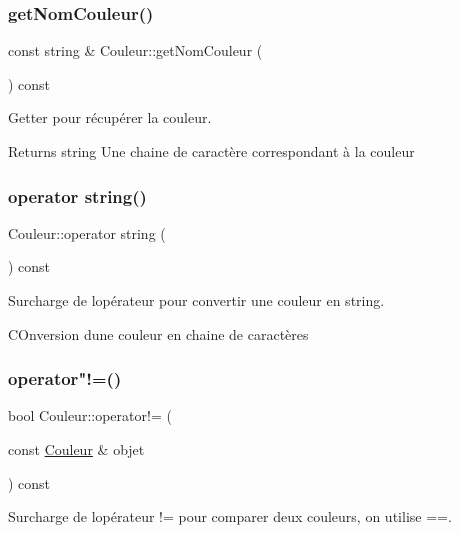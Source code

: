\subsubsection{\texorpdfstring{get\+Nom\+Couleur()}{getNomCouleur()}}
{\footnotesize\ttfamily const string \& Couleur\+::get\+Nom\+Couleur (\begin{DoxyParamCaption}{ }\end{DoxyParamCaption}) const}



Getter pour récupérer la couleur. 

\begin{DoxyReturn}{Returns}
string Une chaine de caractère correspondant à la couleur 
\end{DoxyReturn}
\mbox{\label{class_couleur_acff55563e5760e4cea32ca275eb62205}} 
\subsubsection{\texorpdfstring{operator string()}{operator string()}}
{\footnotesize\ttfamily Couleur\+::operator string (\begin{DoxyParamCaption}{ }\end{DoxyParamCaption}) const}



Surcharge de l\textquotesingle{}opérateur pour convertir une couleur en string. 

C\+Onversion d\textquotesingle{}une couleur en chaine de caractères \mbox{\label{class_couleur_a90eb18d425c9cd6a42814abb34c11183}} 
\subsubsection{\texorpdfstring{operator"!=()}{operator!=()}}
{\footnotesize\ttfamily bool Couleur\+::operator!= (\begin{DoxyParamCaption}\item[{const \hyperlink{class_couleur}{Couleur} \&}]{objet }\end{DoxyParamCaption}) const}



Surcharge de l\textquotesingle{}opérateur != pour comparer deux couleurs, on utilise ==. 


